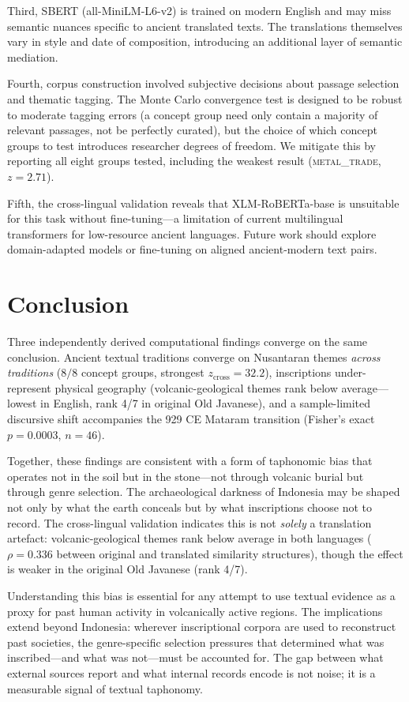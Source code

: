 \documentclass[12pt]{article}
\begin{document}
Third, SBERT (all-MiniLM-L6-v2) is trained on modern English and may miss semantic nuances specific to ancient translated texts.
The translations themselves vary in style and date of composition, introducing an additional layer of semantic mediation.

Fourth, corpus construction involved subjective decisions about passage selection and thematic tagging.
The Monte Carlo convergence test is designed to be robust to moderate tagging errors (a concept group need only contain a majority of relevant passages, not be perfectly curated), but the choice of which concept groups to test introduces researcher degrees of freedom.
We mitigate this by reporting all eight groups tested, including the weakest result (\textsc{metal\_trade}, $z = 2.71$).

Fifth, the cross-lingual validation reveals that XLM-RoBERTa-base is unsuitable for this task without fine-tuning---a limitation of current multilingual transformers for low-resource ancient languages.
Future work should explore domain-adapted models or fine-tuning on aligned ancient-modern text pairs.


\section{Conclusion}

Three independently derived computational findings converge on the same conclusion.
Ancient textual traditions converge on Nusantaran themes \emph{across traditions} ($8/8$ concept groups, strongest $z_\mathrm{cross} = 32.2$), inscriptions under-represent physical geography (volcanic-geological themes rank below average---lowest in English, rank 4/7 in original Old Javanese), and a sample-limited discursive shift accompanies the 929 CE Mataram transition (Fisher's exact $p = 0.0003$, $n = 46$).

Together, these findings are consistent with a form of taphonomic bias that operates not in the soil but in the stone---not through volcanic burial but through genre selection.
The archaeological darkness of Indonesia may be shaped not only by what the earth conceals but by what inscriptions choose not to record.
The cross-lingual validation indicates this is not \emph{solely} a translation artefact: volcanic-geological themes rank below average in both languages ($\rho = 0.336$ between original and translated similarity structures), though the effect is weaker in the original Old Javanese (rank 4/7).

Understanding this bias is essential for any attempt to use textual evidence as a proxy for past human activity in volcanically active regions.
The implications extend beyond Indonesia: wherever inscriptional corpora are used to reconstruct past societies, the genre-specific selection pressures that determined what was inscribed---and what was not---must be accounted for.
The gap between what external sources report and what internal records encode is not noise; it is a measurable signal of textual taphonomy.
\end{document}
